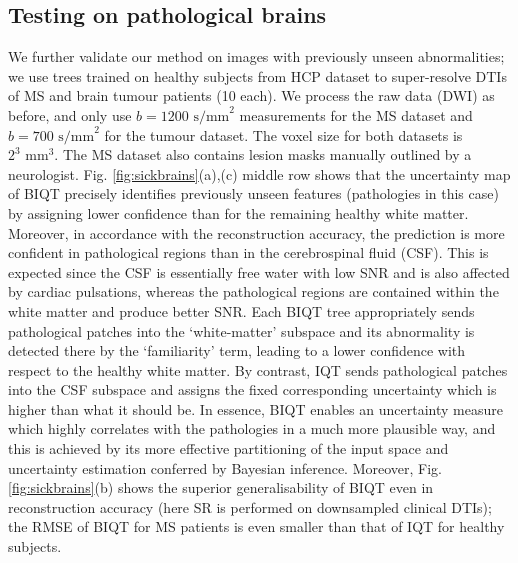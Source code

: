 	\subsection{Testing on pathological brains}
	We further validate our method on images with previously unseen abnormalities; we use trees trained on healthy subjects from HCP dataset to super-resolve DTIs of MS and brain tumour patients (10 each). We process the raw data (DWI) as before, and only use $b = 1200 \text{ s/mm}^2$ measurements for the MS dataset and $b = 700 \text{ s/mm}^2$ for the tumour dataset. The voxel size for both datasets is $2^3 \text{ mm}^3$. The MS dataset also contains lesion masks manually outlined by a neurologist. Fig. \ref{fig:sickbrains}(a),(c) middle row shows that the uncertainty map of BIQT precisely identifies previously unseen features (pathologies in this case) by assigning lower confidence than for the remaining healthy white matter. Moreover, in accordance with the reconstruction accuracy, the prediction is more confident in pathological regions than in the cerebrospinal fluid (CSF). This is expected since the CSF is essentially free water with low SNR and is also affected by cardiac pulsations, whereas the pathological regions are contained within the white matter and produce better SNR. Each BIQT tree appropriately sends pathological patches into the `white-matter' subspace and its abnormality is detected there by the `familiarity' term, leading to a lower confidence with respect to the healthy white matter. By contrast, IQT sends pathological patches into the CSF subspace and assigns the fixed corresponding uncertainty which is higher than what it should be. In essence, BIQT enables an uncertainty measure which highly correlates with the pathologies in a much more plausible way, and this is achieved by its more effective partitioning of the input space and uncertainty estimation conferred by Bayesian inference. Moreover, Fig. \ref{fig:sickbrains}(b) shows the superior generalisability of BIQT even in reconstruction accuracy (here SR is performed on downsampled clinical DTIs); the RMSE of BIQT for MS patients is even smaller than that of IQT for healthy subjects. 


